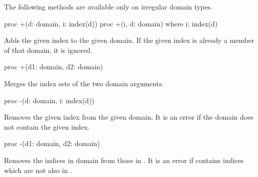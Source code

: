 The following methods are available only on irregular domain types.

\begin{protohead}
proc +(d: domain, i: index(d))
proc +(i, d: domain) where i: index(d)
\end{protohead}
\begin{protobody}
Adds the given index to the given domain.  If the given index is already a
member of that domain, it is ignored.
\end{protobody}

\begin{protohead}
proc +(d1: domain, d2: domain)
\end{protohead}
\begin{protobody}
Merges the index sets of the two domain arguments.
\end{protobody}

\begin{protohead}
proc -(d: domain, i: index(d))
\end{protohead}
\begin{protobody}
Removes the given index from the given domain.  It is an error if the domain
does not contain the given index.
\end{protobody}

\begin{protohead}
proc -(d1: domain, d2: domain)
\end{protohead}
\begin{protobody}
Removes the indices in domain  from those in .  It is an error
if  contains indices which are not also in .
\end{protobody}
